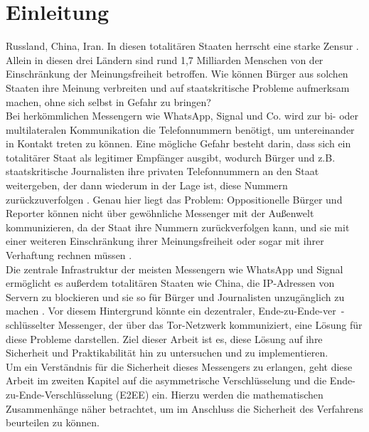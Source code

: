 \documentclass[a4paper,ngerman, headheight=28pt,12pt, footheight=27pt]{scrartcl}
\newcommand{\vcite}[1]{\cite[vgl.][]{#1}}
\begin{document}

\pagestyle{empty}
\tableofcontents
\clearpage
\pagestyle{plain}
%
\setcounter{page}{1}

\linenumbers{}
\modulolinenumbers[5]
\section{Einleitung}
Russland, China, Iran. In diesen totalitären Staaten herrscht eine starke Zensur \vcite{AmnReport}. Allein in diesen drei Ländern sind rund 1,7 Milliarden Menschen von der Einschränkung der Meinungsfreiheit betroffen.
Wie können Bürger aus solchen Staaten ihre Meinung verbreiten und auf staatskritische Probleme aufmerksam machen, ohne sich selbst in Gefahr zu bringen? \\
Bei herkömmlichen Messengern wie WhatsApp, Signal und Co. wird zur bi- oder multilateralen Kommunikation die Telefonnummern benötigt, um untereinander in Kontakt treten zu können. Eine mögliche Gefahr besteht darin, dass sich ein totalitärer Staat als legitimer Empfänger ausgibt, wodurch Bürger und z.B. staatskritische Journalisten ihre privaten Telefonnummern an den Staat weitergeben, der dann wiederum in der Lage ist, diese Nummern zurückzuverfolgen \vcite{LocPolice}. Genau hier liegt das Problem: Oppositionelle Bürger und Reporter können nicht über gewöhnliche Messenger mit der Außenwelt kommunizieren, da der Staat ihre Nummern zurückverfolgen kann, und sie mit einer weiteren Einschränkung ihrer Meinungsfreiheit oder sogar mit ihrer Verhaftung rechnen müssen \vcite{AmnReport}. \\
Die zentrale Infrastruktur der meisten Messengern wie WhatsApp und Signal ermöglicht es außerdem totalitären Staaten wie China, die IP-Adressen von Servern zu blockieren und sie so für Bürger und Journalisten unzugänglich zu machen \vcite{ChinaFirewall,CentralizedWhatsapp}.
Vor diesem Hintergrund könnte ein dezentraler, Ende-zu-Ende-ver~-schlüsselter Messenger, der über das Tor-Netzwerk kommuniziert, eine Lösung für diese Probleme darstellen. Ziel dieser Arbeit ist es, diese Lösung auf ihre Sicherheit und Praktikabilität hin zu untersuchen und zu implementieren.\\
Um ein Verständnis für die Sicherheit dieses Messengers zu erlangen, geht diese Arbeit im zweiten Kapitel auf die asymmetrische Verschlüsselung und die Ende-zu-Ende-Verschlüsselung (E2EE) ein. Hierzu werden die mathematischen Zusammenhänge näher betrachtet, um im Anschluss die Sicherheit des Verfahrens beurteilen zu können.
\end{document}
